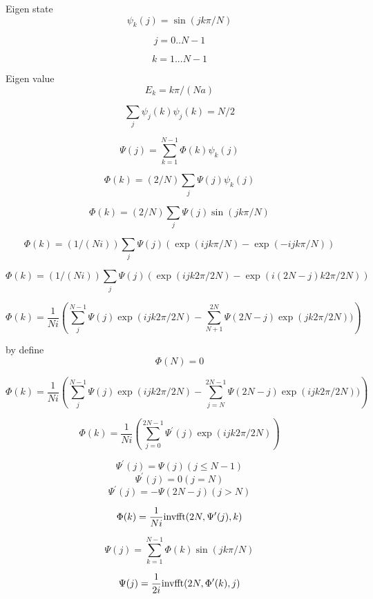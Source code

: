 \documentclass[12pt,twoside]{article}
\begin{document}
Eigen state
$$
\psi_k(j) = \sin(jk\pi/N)
$$

$$
j=0..N-1
$$

$$
k=1...N-1
$$

Eigen value
$$
E_k = k\pi/(N a)
$$

$$
\sum_j \psi_j(k)\psi_j(k) = N/2
$$

$$
\Psi(j) = \sum_{k=1}^{N-1} \Phi(k) \psi_k(j)
$$

$$
\Phi(k) = (2/N) \sum_j \Psi(j) \psi_k(j)
$$

$$
\Phi(k) = (2/N) \sum_j \Psi(j) \sin(jk\pi/N)
$$

$$
\Phi(k) = (1/(Ni)) \sum_j \Psi(j) (\exp(ijk\pi/N) - \exp(-ijk\pi/N))
$$

$$
\Phi(k) = (1/(Ni)) \sum_j \Psi(j) (\exp(ijk2\pi/2N) - \exp(i(2N-j)k2\pi/2N))
$$

$$
\Phi(k) = \frac{1}{Ni}\left(\sum_j^{N-1} \Psi(j)\exp(ijk2\pi/2N) - \sum_{N+1}^{2N} \Psi(2N-j)\exp(jk2\pi/2N))\right)
$$

by define
$$
\Phi(N)=0
$$

$$
\Phi(k) = \frac{1}{Ni}\left(\sum_j^{N-1} \Psi(j)\exp(ijk2\pi/2N) - \sum_{j=N}^{2N-1} \Psi(2N-j)\exp(ijk2\pi/2N))\right)
$$

$$
\Phi(k) = \frac{1}{Ni}\left(\sum_{j=0}^{2N-1} \Psi^\prime(j)\exp(ijk2\pi/2N)\right)
$$

$$
\Psi^\prime(j) = \Psi(j) (j \le N-1)
$$
$$
\Psi^\prime(j) = 0 (j = N)
$$
$$
\Psi^\prime(j) = -\Psi(2N-j) (j > N)
$$

$$
\Phi(k) = \frac{1}{Ni} {\rm inv fft}(2N, \Psi^\prime(j), k)
$$


$$
\Psi(j) = \sum_{k=1}^{N-1} \Phi(k) \sin(jk\pi/N)
$$

$$
\Psi(j) = \frac{1}{2i} {\rm inv fft}(2N, \Phi^\prime(k), j)
$$
\end{document}
